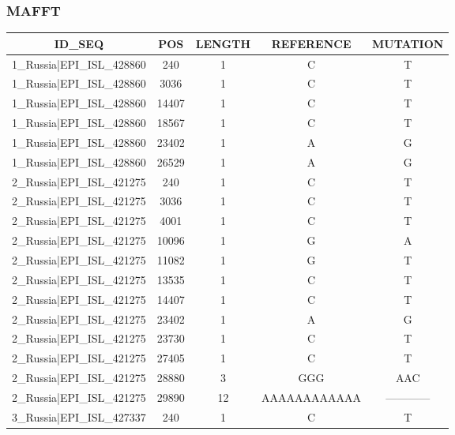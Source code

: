 \documentclass[a4paper,10pt]{article}
\begin{document}
\newpage
\subsubsection{MAFFT}

\begin{longtable}{@{}ccccc@{}}
\toprule
\textbf{ID\_SEQ} & \textbf{POS} & \textbf{LENGTH} & \textbf{REFERENCE} & \textbf{MUTATION} \\* \midrule
\endfirsthead
%
\cline{1-5}
\endhead
%
1\_Russia|EPI\_ISL\_428860 & 240 & 1 & C & T \\* \midrule
1\_Russia|EPI\_ISL\_428860 & 3036 & 1 & C & T \\* \midrule
1\_Russia|EPI\_ISL\_428860 & 14407 & 1 & C & T \\* \midrule
1\_Russia|EPI\_ISL\_428860 & 18567 & 1 & C & T \\* \midrule
1\_Russia|EPI\_ISL\_428860 & 23402 & 1 & A & G \\* \midrule
1\_Russia|EPI\_ISL\_428860 & 26529 & 1 & A & G \\* \midrule
2\_Russia|EPI\_ISL\_421275 & 240 & 1 & C & T \\* \midrule
2\_Russia|EPI\_ISL\_421275 & 3036 & 1 & C & T \\* \midrule
2\_Russia|EPI\_ISL\_421275 & 4001 & 1 & C & T \\* \midrule
2\_Russia|EPI\_ISL\_421275 & 10096 & 1 & G & A \\* \midrule
2\_Russia|EPI\_ISL\_421275 & 11082 & 1 & G & T \\* \midrule
2\_Russia|EPI\_ISL\_421275 & 13535 & 1 & C & T \\* \midrule
2\_Russia|EPI\_ISL\_421275 & 14407 & 1 & C & T \\* \midrule
2\_Russia|EPI\_ISL\_421275 & 23402 & 1 & A & G \\* \midrule
2\_Russia|EPI\_ISL\_421275 & 23730 & 1 & C & T \\* \midrule
2\_Russia|EPI\_ISL\_421275 & 27405 & 1 & C & T \\* \midrule
2\_Russia|EPI\_ISL\_421275 & 28880 & 3 & GGG & AAC \\* \midrule
2\_Russia|EPI\_ISL\_421275 & 29890 & 12 & AAAAAAAAAAAA & ------------ \\* \midrule
3\_Russia|EPI\_ISL\_427337 & 240 & 1 & C & T \\* \midrule

\end{longtable}
\end{document}
